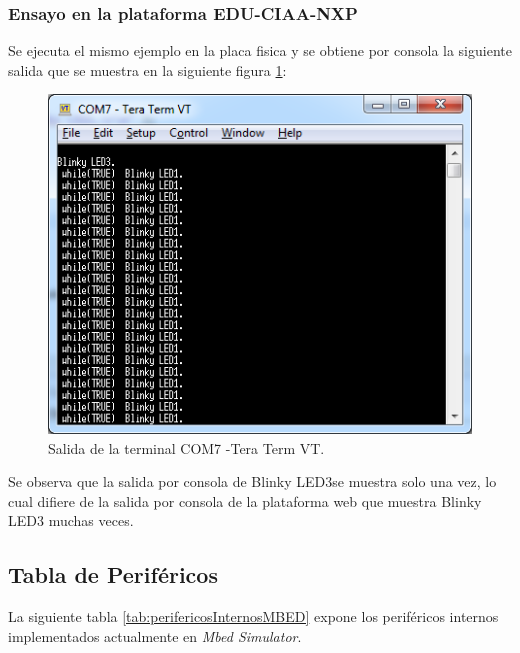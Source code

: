 \subsubsection{Ensayo en la plataforma EDU-CIAA-NXP} 

Se ejecuta el mismo ejemplo en la placa fisica y se obtiene por consola la siguiente salida que se muestra en la siguiente figura \ref{fig:TesttickhookPlaca}:


\begin{figure}[ht]
	\centering
	\includegraphics[scale=.80]{./Figures/TesttickhookPlaca.png}
	\caption{Salida de la terminal COM7 -Tera Term VT.}
	\label{fig:TesttickhookPlaca}
\end{figure}

Se observa que la salida por consola de \textquotedbl Blinky LED3\textquotedbl se muestra solo una vez, lo cual difiere de la salida por consola de la plataforma web que muestra \textquotedbl Blinky LED3\textquotedbl{} muchas veces.


\subsection{Tabla de Periféricos}

La siguiente tabla \ref{tab:perifericosInternosMBED} expone los  periféricos internos implementados actualmente en \textit{Mbed Simulator}.

